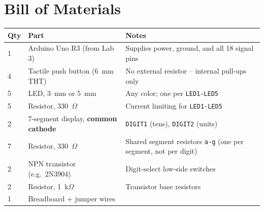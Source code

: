 \documentclass[11pt]{article}
\begin{document}
\section*{Bill of Materials}
\begin{center}
\begin{tabular}{@{}p{1.4cm}p{6.3cm}p{7.5cm}@{}}
\toprule
\textbf{Qty} & \textbf{Part} & \textbf{Notes} \\
\midrule
1 & Arduino Uno R3 (from Lab 3) & Supplies power, ground, and all 18 signal pins \\
4 & Tactile push button (6~mm THT) & No external resistor -- internal pull-ups only \\
5 & LED, 3~mm or 5~mm & Any color; one per \texttt{LED1-LED5} \\
5 & Resistor, 330~$\Omega$ & Current limiting for \texttt{LED1-LED5} \\
2 & 7-segment display, \textbf{common cathode} & \texttt{DIGIT1} (tens), \texttt{DIGIT2} (units) \\
7 & Resistor, 330~$\Omega$ & Shared segment resistors \texttt{a-g} (one per segment, not per digit) \\
2 & NPN transistor (e.g.\ 2N3904) & Digit-select low-side switches \\
2 & Resistor, 1~k$\Omega$ & Transistor base resistors \\
1 & Breadboard + jumper wires & \\
\bottomrule
\end{tabular}
\end{center}
\end{document}
